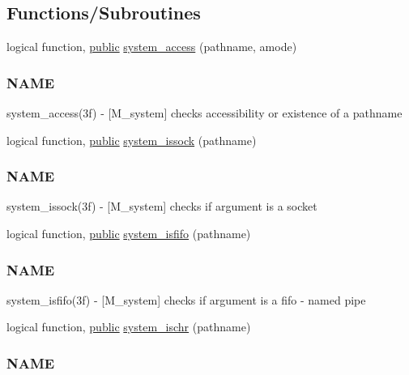 \subsection*{Functions/\+Subroutines}
\begin{DoxyCompactItemize}
\item 
logical function, \hyperlink{M__stopwatch_83_8txt_a2f74811300c361e53b430611a7d1769f}{public} \hyperlink{namespacem__system_a4687a363acbb7084a51bc77844789275}{system\+\_\+access} (pathname, amode)
\begin{DoxyCompactList}\small\item\em \subsubsection*{N\+A\+ME}

system\+\_\+access(3f) -\/ \mbox{[}M\+\_\+system\mbox{]} checks accessibility or existence of a pathname \end{DoxyCompactList}\item 
logical function, \hyperlink{M__stopwatch_83_8txt_a2f74811300c361e53b430611a7d1769f}{public} \hyperlink{namespacem__system_af6eb5074fe74552bc7a5e7d00f459087}{system\+\_\+issock} (pathname)
\begin{DoxyCompactList}\small\item\em \subsubsection*{N\+A\+ME}

system\+\_\+issock(3f) -\/ \mbox{[}M\+\_\+system\mbox{]} checks if argument is a socket \end{DoxyCompactList}\item 
logical function, \hyperlink{M__stopwatch_83_8txt_a2f74811300c361e53b430611a7d1769f}{public} \hyperlink{namespacem__system_acbcaa0c5075ca103815f441ee410e1a3}{system\+\_\+isfifo} (pathname)
\begin{DoxyCompactList}\small\item\em \subsubsection*{N\+A\+ME}

system\+\_\+isfifo(3f) -\/ \mbox{[}M\+\_\+system\mbox{]} checks if argument is a fifo -\/ named pipe \end{DoxyCompactList}\item 
logical function, \hyperlink{M__stopwatch_83_8txt_a2f74811300c361e53b430611a7d1769f}{public} \hyperlink{namespacem__system_a12a948fa4aacda084a538ae3a5ae3cc6}{system\+\_\+ischr} (pathname)
\begin{DoxyCompactList}\small\item\em \subsubsection*{N\+A\+ME}


\end{DoxyCompactList}
\end{DoxyCompactItemize}

